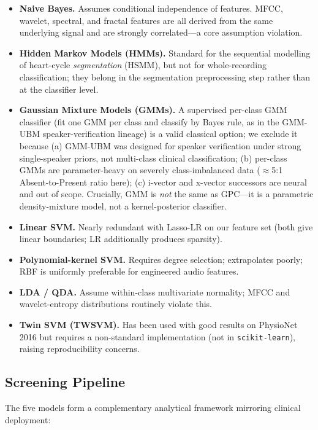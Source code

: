 \documentclass[10pt,twocolumn]{article}
\begin{document}
\begin{itemize}[leftmargin=*,itemsep=0.1em]
    \item \textbf{Naive Bayes.} Assumes conditional independence of features. MFCC, wavelet, spectral, and fractal features are all derived from the same underlying signal and are strongly correlated---a core assumption violation.
    \item \textbf{Hidden Markov Models (HMMs).} Standard for the sequential modelling of heart-cycle \textit{segmentation} (HSMM), but not for whole-recording classification; they belong in the segmentation preprocessing step rather than at the classifier level.
    \item \textbf{Gaussian Mixture Models (GMMs).} A supervised per-class GMM classifier (fit one GMM per class and classify by Bayes rule, as in the GMM-UBM speaker-verification lineage) is a valid classical option; we exclude it because (a) GMM-UBM was designed for speaker verification under strong single-speaker priors, not multi-class clinical classification; (b) per-class GMMs are parameter-heavy on severely class-imbalanced data ($\approx$5:1 Absent-to-Present ratio here); (c) i-vector and x-vector successors are neural and out of scope. Crucially, GMM is \textit{not} the same as GPC---it is a parametric density-mixture model, not a kernel-posterior classifier.
    \item \textbf{Linear SVM.} Nearly redundant with Lasso-LR on our feature set (both give linear boundaries; LR additionally produces sparsity).
    \item \textbf{Polynomial-kernel SVM.} Requires degree selection; extrapolates poorly; RBF is uniformly preferable for engineered audio features.
    \item \textbf{LDA / QDA.} Assume within-class multivariate normality; MFCC and wavelet-entropy distributions routinely violate this.
    \item \textbf{Twin SVM (TWSVM).} Has been used with good results on PhysioNet 2016 but requires a non-standard implementation (not in \texttt{scikit-learn}), raising reproducibility concerns.
\end{itemize}

\subsection{Screening Pipeline}

The five models form a complementary analytical framework mirroring clinical deployment:
\end{document}
